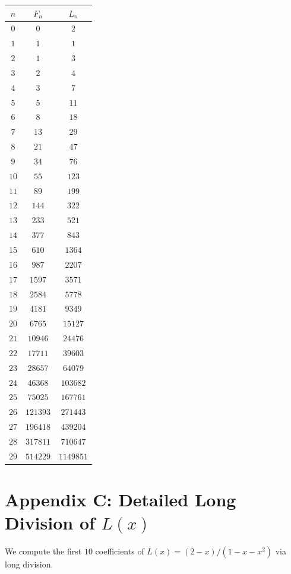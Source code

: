\begin{tabular}{|c|c|c|}
  \hline
  $n$ & $F_n$ & $L_n$ \\
  \hline
  $0$ & $0$ & $2$ \\
  $1$ & $1$ & $1$ \\
  $2$ & $1$ & $3$ \\
  $3$ & $2$ & $4$ \\
  $4$ & $3$ & $7$ \\
  $5$ & $5$ & $11$ \\
  $6$ & $8$ & $18$ \\
  $7$ & $13$ & $29$ \\
  $8$ & $21$ & $47$ \\
  $9$ & $34$ & $76$ \\
  $10$ & $55$ & $123$ \\
  $11$ & $89$ & $199$ \\
  $12$ & $144$ & $322$ \\
  $13$ & $233$ & $521$ \\
  $14$ & $377$ & $843$ \\
  $15$ & $610$ & $1364$ \\
  $16$ & $987$ & $2207$ \\
  $17$ & $1597$ & $3571$ \\
  $18$ & $2584$ & $5778$ \\
  $19$ & $4181$ & $9349$ \\
  $20$ & $6765$ & $15127$ \\
  $21$ & $10946$ & $24476$ \\
  $22$ & $17711$ & $39603$ \\
  $23$ & $28657$ & $64079$ \\
  $24$ & $46368$ & $103682$ \\
  $25$ & $75025$ & $167761$ \\
  $26$ & $121393$ & $271443$ \\
  $27$ & $196418$ & $439204$ \\
  $28$ & $317811$ & $710647$ \\
  $29$ & $514229$ & $1149851$ \\
  \hline
\end{tabular}

\section*{Appendix C: Detailed Long Division of $L(x)$}
\label{fa_05:sec:05-app-C}

We compute the first $10$ coefficients of $L(x) = (2-x)/(1-x-x^2)$ via
long division.

